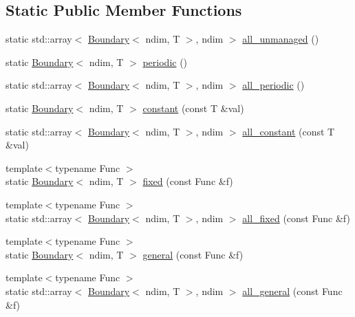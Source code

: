 \subsection*{Static Public Member Functions}
\begin{DoxyCompactItemize}
\item 
static std\+::array$<$ \hyperlink{classshark_1_1ndim_1_1_boundary}{Boundary}$<$ ndim, T $>$, ndim $>$ \hyperlink{classshark_1_1ndim_1_1_boundary_ad2764d304ad8f207a882d1aaa93b96e1}{all\+\_\+unmanaged} ()
\item 
static \hyperlink{classshark_1_1ndim_1_1_boundary}{Boundary}$<$ ndim, T $>$ \hyperlink{classshark_1_1ndim_1_1_boundary_af999765d8c5dccc13a4e8e224f966fc5}{periodic} ()
\item 
static std\+::array$<$ \hyperlink{classshark_1_1ndim_1_1_boundary}{Boundary}$<$ ndim, T $>$, ndim $>$ \hyperlink{classshark_1_1ndim_1_1_boundary_a79f22388bb5c66d131918c1b68125a90}{all\+\_\+periodic} ()
\item 
static \hyperlink{classshark_1_1ndim_1_1_boundary}{Boundary}$<$ ndim, T $>$ \hyperlink{classshark_1_1ndim_1_1_boundary_a8e8433bf2c6f1f27f0e4192fd03f70a5}{constant} (const T \&val)
\item 
static std\+::array$<$ \hyperlink{classshark_1_1ndim_1_1_boundary}{Boundary}$<$ ndim, T $>$, ndim $>$ \hyperlink{classshark_1_1ndim_1_1_boundary_afe55524d0fe2276ec019549ab88fb1a3}{all\+\_\+constant} (const T \&val)
\item 
{\footnotesize template$<$typename Func $>$ }\\static \hyperlink{classshark_1_1ndim_1_1_boundary}{Boundary}$<$ ndim, T $>$ \hyperlink{classshark_1_1ndim_1_1_boundary_a713a06547690904ed24cdb3c92190ea5}{fixed} (const Func \&f)
\item 
{\footnotesize template$<$typename Func $>$ }\\static std\+::array$<$ \hyperlink{classshark_1_1ndim_1_1_boundary}{Boundary}$<$ ndim, T $>$, ndim $>$ \hyperlink{classshark_1_1ndim_1_1_boundary_ac4a1c6582cb46a3f1eb59acf416860a7}{all\+\_\+fixed} (const Func \&f)
\item 
{\footnotesize template$<$typename Func $>$ }\\static \hyperlink{classshark_1_1ndim_1_1_boundary}{Boundary}$<$ ndim, T $>$ \hyperlink{classshark_1_1ndim_1_1_boundary_a1820cabb4bd234cd1e08179f39bf5a8d}{general} (const Func \&f)
\item 
{\footnotesize template$<$typename Func $>$ }\\static std\+::array$<$ \hyperlink{classshark_1_1ndim_1_1_boundary}{Boundary}$<$ ndim, T $>$, ndim $>$ \hyperlink{classshark_1_1ndim_1_1_boundary_abad9349a25882ff5d9f6b7d4db8e27ce}{all\+\_\+general} (const Func \&f)
\end{DoxyCompactItemize}
